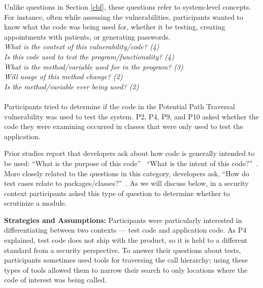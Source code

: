\documentclass[10pt,journal,compsoc]{IEEEtran}
\begin{document}
Unlike questions in Section \ref{cbf}, these questions refer to system-level concepts.
For instance, often while assessing the vulnerabilities, participants wanted to know what the code was being used for, whether it be testing, creating appointments with patients, or generating passwords.
\\

\noindent\emph{What is the context of this vulnerability/code? (4)} \\
\emph{Is this code used to test the program/functionality? (4)} \\
\emph{What is the method/variable used for in the program? (3)} \\
\emph{Will usage of this method change? (2)} \\
\emph{Is the method/variable ever being used? (2)} \\
\\


Participants tried to determine if the code in the Potential Path Traversal vulnerability was used to test the system. 
P2, P4, P9, and P10 asked whether the code they were examining occurred in classes that were only used to test the application. 

Prior studies report that developers ask about how code is generally intended to be used:
``What is the purpose of this code''~\cite{Ko:2007:information}
``What is the intent of this code?''~\cite{latoza2010hard}.
More closely related to the questions in this category, developers ask,
``How do test cases relate to packages/classes?''~\cite{fritz2010using}.
As we will discuss below, in a security context participants asked this type of question to determine whether to scrutinize a module.


\textbf{Strategies and Assumptions:}
Participants were particularly interested in differentiating between two contexts --- test code and application code. 
As P4 explained, test code does not ship with the product, so it is held to a different standard from a security perspective. 
To answer their questions about tests, participants sometimes used tools for traversing the call hierarchy; using these types of tools allowed them to narrow their search to only locations where the code of interest was being called.
\end{document}
